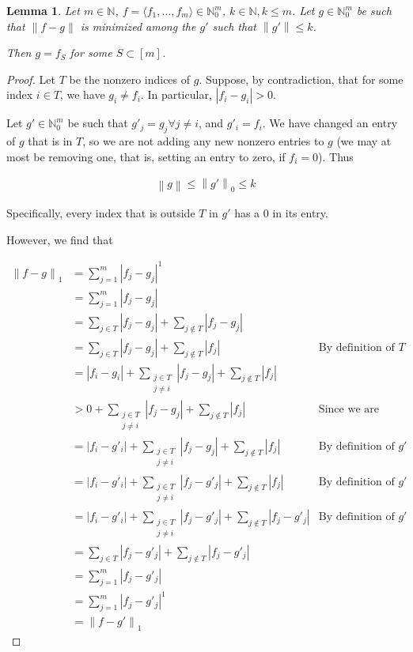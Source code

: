 \documentclass[11pt]{amsart}
\newtheorem{lemma}[theorem]{Lemma}
\newcommand{\norm}[1]{\left\lVert #1 \right\rVert}
\begin{document}
\begin{lemma}\label{lemS1}
Let $m \in \mathbb{N}$, $f = \langle f_1, \dots, f_m \rangle \in \mathbb{N}_0^m$, $k \in \mathbb{N}, k \le m$. Let $g \in \mathbb{N}_0^m$ be such that $\norm{f - g}$ is minimized among the $g'$ such that $\norm{g'} \le k$.

Then $g = f_S$ for some $S \subset [m]$.
\end{lemma}
\begin{proof}
Let $T$ be the nonzero indices of $g$. Suppose, by contradiction, that for some index $i \in T$, we have $g_i \ne f_i$. In particular, $|f_i - g_i| > 0$.

Let $g' \in \mathbb{N}_0^m$ be such that $g'_j = g_j \forall j \ne i$, and $g'_i = f_i$. We have changed an entry of $g$ that is in $T$, so we are not adding any new nonzero entries to $g$ (we may at most be removing one, that is, setting an entry to zero, if $f_i = 0$). Thus 

\begin{align}\label{fit}
\norm{g} \le \norm{g'}_0 \le k
\end{align}

Specifically, every index that is outside $T$ in $g'$ has a 0 in its entry.

However, we find that

\begin{align*}
\norm{f - g}_1 &= \sum_{j = 1}^m |f_j - g_j|^1\\
               &= \sum_{j = 1}^m |f_j - g_j|\\
               &= \sum_{j \in T} |f_j - g_j| + \sum_{j \not\in T} |f_j - g_j|\\
               &= \sum_{j \in T} |f_j - g_j| + \sum_{j \not\in T} |f_j| & \text{By definition of }T\\
               &= |f_i - g_i| + \sum_{\substack{j \in T\\j \ne i}} |f_j - g_j| + \sum_{j \not\in T} |f_j|\\
               &> 0 + \sum_{\substack{j \in T\\j \ne i}} |f_j - g_j| + \sum_{j \not\in T} |f_j| & \text{Since we are dropping a positive term}\\
               &= |f_i - g'_i| + \sum_{\substack{j \in T\\j \ne i}} |f_j - g_j| + \sum_{j \not\in T} |f_j| & \text{By definition of }g'\\
               &= |f_i - g'_i| + \sum_{\substack{j \in T\\j \ne i}} |f_j - g'_j| + \sum_{j \not\in T} |f_j| & \text{By definition of }g'\\
               &= |f_i - g'_i| + \sum_{\substack{j \in T\\j \ne i}} |f_j - g'_j| + \sum_{j \not\in T} |f_j - g'_j| & \text{By definition of }g'\\
               &= \sum_{j \in T} |f_j - g'_j| + \sum_{j \not\in T} |f_j - g'_j|\\
               &= \sum_{j = 1}^m |f_j - g'_j|\\
               &= \sum_{j = 1}^m |f_j - g'_j|^1\\
               &= \norm{f - g'}_1
\end{align*}


\end{proof}
\end{document}

